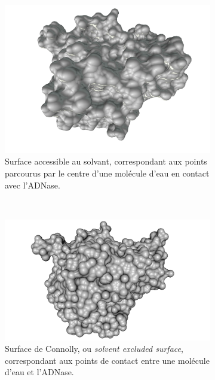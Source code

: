 	\begin{figure}[H]
		\begin{subfigure}[t]{\subImgW}
			\centering
			\includegraphics[width=\textwidth]{./figures/ch1/4awn_sas}
			\caption{Surface accessible au solvant, correspondant aux points parcourus par le centre d'une molécule d'eau en contact avec l'ADNase.}
			\label{fig:4awn_sas}
		\end{subfigure}
		~
		\begin{subfigure}[t]{\subImgW}
			\centering
			\includegraphics[width=\textwidth]{./figures/ch1/4awn_ses}
			\caption{Surface de Connolly, ou \emph{solvent excluded surface}, correspondant aux points de contact entre une molécule d'eau et l'ADNase.}
			\label{fig:4awn_ses}
		\end{subfigure}
		~
		\begin{subfigure}[t]{\subImgW}
			\centering

\end{subfigure}
\end{figure}
